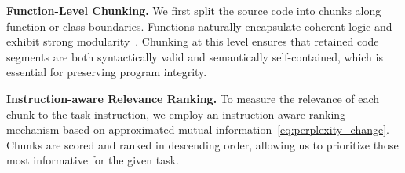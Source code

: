 \documentclass[10pt,conference]{IEEEtran}
\newcommand{\todoc}[2]{{\textcolor{#1}{\textbf{[#2]}}}}
\newcommand{\shi}[1]{\todoc{orange}{Shi: #1}}
\newcommand{\qian}[1]{\todoc{violet}{Qian: #1}}
\begin{document}
\noindent\textbf{Function-Level Chunking.} We first split the source code into chunks along function or class boundaries. Functions naturally encapsulate coherent logic and exhibit strong modularity~\cite{feng2020codebert}. Chunking at this level ensures that retained code segments are both syntactically valid and semantically self-contained, which is essential for preserving program integrity.

\noindent\textbf{Instruction-aware Relevance Ranking.}
To measure the relevance of each chunk to the task instruction, we employ an instruction-aware ranking mechanism based on approximated mutual information~\eqref{eq:perplexity_change}. Chunks are scored and ranked in descending order, allowing us to prioritize those most informative for the given task.

\end{document}
